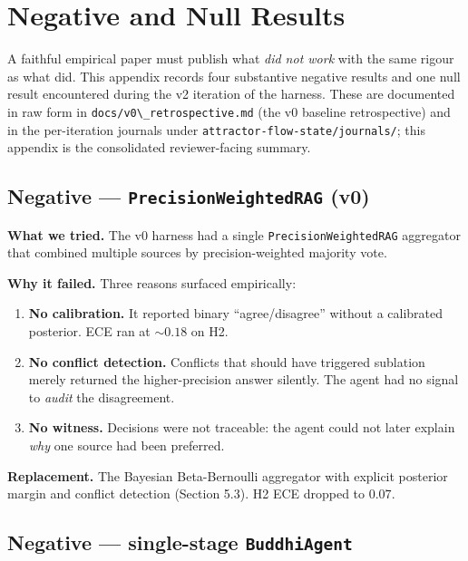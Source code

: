 \section{Negative and Null Results}\label{negative-and-null-results}

A faithful empirical paper must publish what \emph{did not work} with the same rigour as what did. This appendix records four substantive negative results and one null result encountered during the v2 iteration of the harness. These are documented in raw form in \passthrough{\lstinline!docs/v0\_retrospective.md!} (the v0 baseline retrospective) and in the per-iteration journals under \passthrough{\lstinline!attractor-flow-state/journals/!}; this appendix is the consolidated reviewer-facing summary.

\subsection{\texorpdfstring{Negative --- \texttt{PrecisionWeightedRAG} (v0)}{Negative --- PrecisionWeightedRAG (v0)}}\label{negative-precisionweightedrag-v0}

\textbf{What we tried.} The v0 harness had a single \passthrough{\lstinline!PrecisionWeightedRAG!} aggregator that combined multiple sources by precision-weighted majority vote.

\textbf{Why it failed.} Three reasons surfaced empirically:

\begin{enumerate}
\def\labelenumi{\arabic{enumi}.}
\tightlist
\item
  \textbf{No calibration.} It reported binary ``agree/disagree'' without a calibrated posterior. ECE ran at \(\sim 0.18\) on H2.
\item
  \textbf{No conflict detection.} Conflicts that should have triggered sublation merely returned the higher-precision answer silently. The agent had no signal to \emph{audit} the disagreement.
\item
  \textbf{No witness.} Decisions were not traceable: the agent could not later explain \emph{why} one source had been preferred.
\end{enumerate}

\textbf{Replacement.} The Bayesian Beta-Bernoulli aggregator with explicit posterior margin and conflict detection (Section 5.3). H2 ECE dropped to \(0.07\).

\subsection{\texorpdfstring{Negative --- single-stage \texttt{BuddhiAgent}}{Negative --- single-stage BuddhiAgent}}\label{negative-single-stage-buddhiagent}

